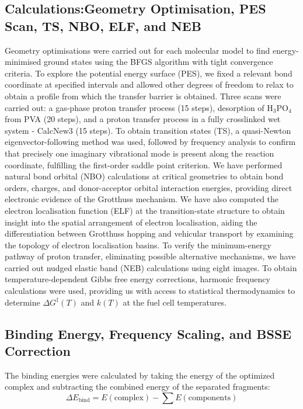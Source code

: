 \documentclass[12pt,a4paper]{report}
\begin{document}
\subsection{Calculations:Geometry Optimisation, PES Scan, TS, NBO, ELF, and NEB}
Geometry optimisations were carried out for each molecular model to find energy-minimised ground states using the BFGS algorithm with tight convergence criteria.\cite{81} To explore the potential energy surface (PES), we fixed a relevant bond coordinate at specified intervals and allowed other degrees of freedom to relax to obtain a profile from which the transfer barrier is obtained. Three scans were carried out: a gas-phase proton transfer process (15 steps), desorption of H\(_3\)PO\(_4\) from PVA (20 steps), and a proton transfer process in a fully crosslinked wet system - CalcNew3 (15 steps). To obtain transition states (TS), a quasi-Newton eigenvector-following method was used, followed by frequency analysis to confirm that precisely one imaginary vibrational mode is present along the reaction coordinate, fulfilling the first-order saddle point criterion.\cite{81,82,83}
We have performed natural bond orbital (NBO) calculations at critical geometries to obtain bond orders, charges, and donor-acceptor orbital interaction energies, providing direct electronic evidence of the Grotthuss mechanism.\cite{84,85}
We have also computed the electron localisation function (ELF) at the transition-state structure to obtain insight into the spatial arrangement of electron localisation, aiding the differentiation between Grotthuss hopping and vehicular transport by examining the topology of electron localisation basins.\cite{86,87,88}
To verify the minimum-energy pathway of proton transfer, eliminating possible alternative mechanisms, we have carried out nudged elastic band (NEB) calculations using eight images.\cite{89,90,91}
To obtain temperature-dependent Gibbs free energy corrections, harmonic frequency calculations were used, providing us with access to statistical thermodynamics to determine \(\Delta G^{\ddagger}(T)\) and \(k(T)\) at the fuel cell temperatures.\cite{92,93}

\subsection{Binding Energy, Frequency Scaling, and BSSE Correction}
The binding energies were calculated by taking the energy of the optimized complex and subtracting the combined energy of the separated fragments:
\[
\Delta E_{\text{bind}} = E(\text{complex}) - \sum E(\text{components}) \tag{3.7}
\]
\end{document}
